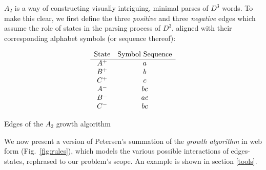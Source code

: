 \documentclass[nonatbib,numbers,10pt]{sigplanconf}
\begin{document}
$A_2$ is a way of constructing visually intriguing, minimal parses of $D^3$ words. To make this clear, we first define the three \textit{positive} and three \textit{negative} edges which assume the role of states in the parsing process of $D^3$, aligned with their corresponding alphabet symbols (or sequence thereof):
\begin{table}[h!]
\[\begin{array}{c c}
$State$ & $Symbol Sequence$\\
\hline
A^+ & a\\
B^+ & b\\
C^+ & c\\
A^- & bc\\
B^- & ac\\
C^- & bc\\
\end{array}\]
\caption{Edges of the $A_2$ growth algorithm}
\label{fig:states}
\end{table}

We now present a version of Petersen's summation of the \textit{growth algorithm}\cite{petersen} in web form (Fig.~\ref{fig:rules}), which models the various possible interactions of edges-states, rephrased to our problem's scope. An example is shown in section \ref{tools}.
\end{document}
